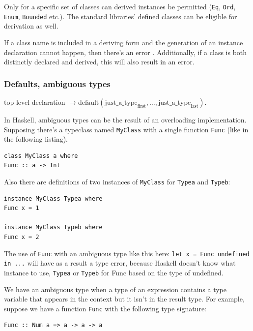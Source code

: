 \documentclass[a4paper, titlepage, twoside]{article}
\begin{document}
Only for a specific set of classes can derived instances be permitted (\texttt{Eq}, \texttt{Ord}, \texttt{Enum}, \texttt{Bounded} etc.). The standard libraries’ defined classes can be eligible for derivation as well.

If a class name is included in a deriving form and the generation of an instance declaration cannot happen, then there’s an error \autocite{marlowHaskell2010Language2010}. Additionally, if a class is both distinctly declared and derived, this will also result in an error.

\subsubsection{Defaults, ambiguous types}
\label{sec:org7b9f4e1}

top level declaration \(\rightarrow \text{default} (\text{just}\_\text{a}\_\text{type}_{\text{first}}, \dots, \text{just}\_\text{a}\_\text{type}_{\text{last}})\).

In Haskell, ambiguous types can be the result of an overloading implementation. Supposing there’s a
typeclass named \texttt{MyClass} with a single function \texttt{Func} (like in the following listing).

\begin{verbatim}
class MyClass a where
Func :: a -> Int
\end{verbatim}

Also there are definitions of two instances of \texttt{MyClass} for \texttt{Typea} and \texttt{Typeb}:

\begin{verbatim}
instance MyClass Typea where
Func x = 1

instance MyClass Typeb where
Func x = 2  
\end{verbatim}

The use of \texttt{Func} with an ambiguous type like this here: \texttt{let x = Func undefined in ...} will have as a result a type error, because Haskell doesn't know what instance to use, \texttt{Typea} or \texttt{Typeb} for Func based on the type of undefined.

We have an ambiguous type when a type of an expression contains a type variable that appears in the
context but it isn't in the result type. For example, suppose we have a function \texttt{Func} with the following type signature:

\begin{verbatim}
Func :: Num a => a -> a -> a
\end{verbatim}
\end{document}
